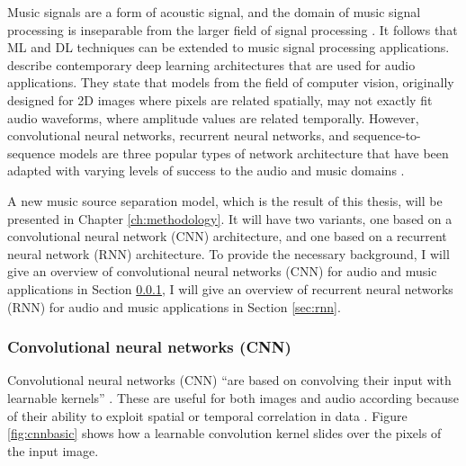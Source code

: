 \documentclass[report.tex]{subfiles}
\begin{document}
Music signals are a form of acoustic signal, and the domain of music signal processing is inseparable from the larger field of signal processing \parencite{musicsp}. It follows that ML and DL techniques can be extended to music signal processing applications. \textcite{audiodeeplearning} describe contemporary deep learning architectures that are used for audio applications. They state that models from the field of computer vision, originally designed for 2D images where pixels are related spatially, may not exactly fit audio waveforms, where amplitude values are related temporally. However, convolutional neural networks, recurrent neural networks, and sequence-to-sequence models are three popular types of network architecture that have been adapted with varying levels of success to the audio and music domains \parencite{audiodeeplearning}.

A new music source separation model, which is the result of this thesis, will be presented in Chapter \ref{ch:methodology}. It will have two variants, one based on a convolutional neural network (CNN) architecture, and one based on a recurrent neural network (RNN) architecture. To provide the necessary background, I will give an overview of convolutional neural networks (CNN) for audio and music applications in Section \ref{sec:cnn}, I will give an overview of recurrent neural networks (RNN) for audio and music applications in Section \ref{sec:rnn}.

\subsubsection{Convolutional neural networks (CNN)}
\label{sec:cnn}

Convolutional neural networks (CNN) ``are based on convolving their input with learnable kernels'' \parencite[3]{audiodeeplearning}. These are useful for both images and audio according because of their ability to exploit spatial or temporal correlation in data \parencite{cnns}. Figure \ref{fig:cnnbasic} shows how a learnable convolution kernel slides over the pixels of the input image.
\end{document}

